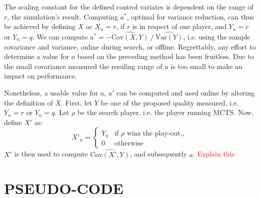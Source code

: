 \documentclass{ecai2014}
\newcommand\todo[1]{\textcolor{red}{#1}}
\newcommand{\Var}[1]{\mathrm{Var}\left( #1 \right)}
\newcommand{\Cov}[1]{\mathrm{Cov}\left( #1 \right)}
\begin{document}
The scaling constant for the defined control variates is dependent on the range of $r$, the simulation's result. Computing $a^*$, optimal for variance reduction, can thus be achieved by defining $X$ as $X_n = r$, if $r$ is in respect of one player, and $Y_n=r$ or $Y_n=q$. We can compute $a^*=-\widehat{\Cov{X,Y}}\mathbin{/}\widehat{\Var{Y}}$, i.e. using the sample covariance and variance, online during search, or offline. Regrettably, any effort to determine a value for $a$ based on the preceding method has been fruitless. Due to the small covariance measured the resuling range of $a$ is too small to make an impact on performance.

Nonetheless, a usable value for $a$, $a'$ can be computed and used online by altering the definition of $X$. First, let $Y$ be one of the proposed quality measured, i.e. $Y_n=r$ or $Y_n=q$. Let $\rho$ be the search player, i.e. the player running MCTS. Now, define $X'$ as:
\begin{equation}
X'_n =
\begin{cases}
   Y_n & \text{if $\rho$ wins the play-out,}, \\
   0   & \text{otherwise}
\end{cases}
\label{eq:xprime}
\end{equation}
$X'$ is then used to compute $\widehat{\Cov{X',Y}}$, and subsequently $a$. \todo{Explain this}

\section{PSEUDO-CODE}
\end{document}
